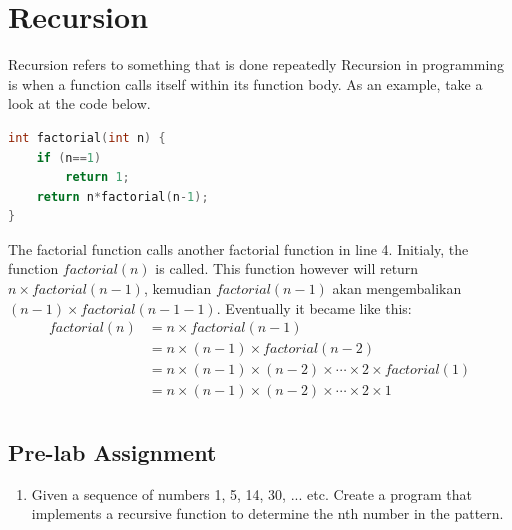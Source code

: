 \section{Recursion}
Recursion refers to something that is done repeatedly
Recursion in programming is when a function calls itself within its function body.
As an example, take a look at the code below.
\begin{lstlisting}[language=c,caption = Factorial with a recursion,label=lst:recursionexample01]
    int factorial(int n) {
    if (n==1)
        return 1;
    return n*factorial(n-1);
}
\end{lstlisting}
The factorial function calls another factorial function in line 4.
Initialy, the function $factorial(n)$ is called. This function however will return 
$n\times factorial(n-1)$, kemudian $factorial(n-1)$ akan mengembalikan $(n-1)\times factorial(n-1-1)$.
Eventually it became like this:
\begin{equation*}
    \begin{split}
        factorial(n)& = n \times factorial(n-1)\\
        & = n \times (n-1) \times factorial(n-2)\\
        & = n \times (n-1) \times (n-2) \times \cdots \times 2 \times factorial(1)\\
        & = n \times (n-1) \times (n-2) \times \cdots \times 2 \times 1\\
    \end{split}
\end{equation*}

\subsection{Pre-lab Assignment}
\begin{enumerate}
    \item Given a sequence of numbers 1, 5, 14, 30, ... etc. Create a program that implements a recursive function to determine the nth number in the pattern.
\end{enumerate}